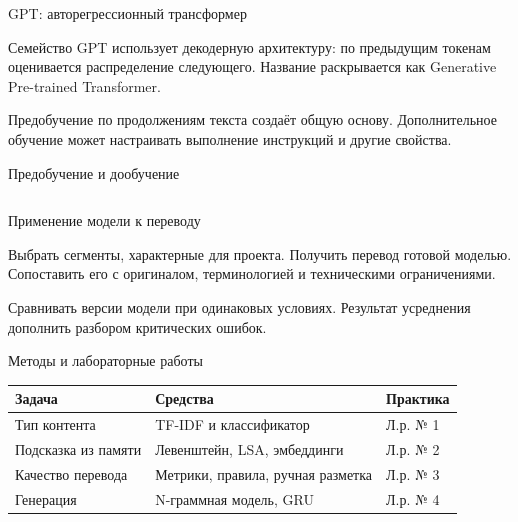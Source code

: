 \documentclass[aspectratio=169,12pt]{beamer}
\begin{document}
\begin{frame}{GPT: авторегрессионный трансформер}
\color{ink}
{\small Семейство GPT использует декодерную архитектуру: по предыдущим токенам оценивается распределение следующего. Название раскрывается как Generative Pre-trained Transformer.
\par\vspace{0.6em}Предобучение по продолжениям текста создаёт общую основу. Дополнительное обучение может настраивать выполнение инструкций и другие свойства.}
\end{frame}

\begin{frame}{Предобучение и дообучение}
\color{ink}
\begin{columns}[T,onlytextwidth]
\end{columns}
\end{frame}

\begin{frame}{Применение модели к переводу}
\color{ink}
{\small Выбрать сегменты, характерные для проекта. Получить перевод готовой моделью. Сопоставить его с оригиналом, терминологией и техническими ограничениями.
\par\vspace{0.6em}Сравнивать версии модели при одинаковых условиях. Результат усреднения дополнить разбором критических ошибок.}
\end{frame}

\begin{frame}{Методы и лабораторные работы}
\color{ink}
{\small\renewcommand{\arraystretch}{1.15}\begin{tabular}{@{}Л{0.29} Л{0.44} Л{0.19}@{}}\toprule
Задача & Средства & Практика\\\midrule
Тип контента & TF-IDF и классификатор & Л.р. № 1\\[0.15em]
Подсказка из памяти & Левенштейн, LSA, эмбеддинги & Л.р. № 2\\[0.15em]
Качество перевода & Метрики, правила, ручная разметка & Л.р. № 3\\[0.15em]
Генерация & N-граммная модель, GRU & Л.р. № 4\\[0.15em]\bottomrule\end{tabular}}
\end{frame}
\end{document}

